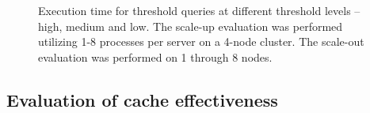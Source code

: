 \documentclass{sig-alternate}
\begin{document}
\begin{figure}
\centering
{}
\caption{Execution time for threshold queries at different threshold levels -- high, medium and low. The scale-up evaluation was performed 
utilizing 1-8 processes per server on a 4-node cluster. The scale-out evaluation was performed on 1 through 8 nodes.}
\label{fig:scaling}
\end{figure}

\subsection{Evaluation of cache effectiveness}
\end{document}
